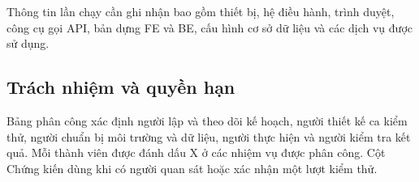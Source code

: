 Thông tin lần chạy cần ghi nhận bao gồm thiết bị, hệ điều hành, trình duyệt, công cụ gọi API, bản dựng FE và BE, cấu hình cơ sở dữ liệu và các dịch vụ được sử dụng.

\subsection{Trách nhiệm và quyền hạn}

Bảng phân công xác định người lập và theo dõi kế hoạch, người thiết kế ca kiểm thử, người chuẩn bị môi trường và dữ liệu, người thực hiện và người kiểm tra kết quả. Mỗi thành viên được đánh dấu X ở các nhiệm vụ được phân công. Cột Chứng kiến dùng khi có người quan sát hoặc xác nhận một lượt kiểm thử.

\begin{table}[H]
    \centering
    \caption{Bảng phân công trách nhiệm kiểm thử}
    \label{tab:testing-responsibility}
    \fontsize{10}{12}\selectfont
    \setlength{\tabcolsep}{4pt}
    \renewcommand{\arraystretch}{1.2}
\end{table}


